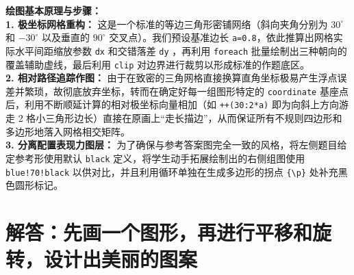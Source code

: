{\small\color{blue!70!black}
\textbf{绘图基本原理与步骤：}\\
\textbf{1. 极坐标网格重构：} 这是一个标准的等边三角形密铺网络（斜向夹角分别为 $30^\circ$ 和 $-30^\circ$ 以及垂直的 $90^\circ$ 交叉点）。我们预设基准边长 \texttt{a=0.8}，依此推算出网格实际水平间距缩放参数 \texttt{dx} 和交错落差 \texttt{dy} ，再利用 \texttt{foreach} 批量绘制出三种朝向的覆盖辅助虚线，最后利用 \texttt{clip} 对边界进行裁剪以形成标准的作题底区。\\
\textbf{2. 相对路径追踪作图：} 由于在致密的三角网格直接换算直角坐标极易产生浮点误差并繁琐，故彻底放弃坐标，转而在确定好每一组图形特定的 \texttt{coordinate} 基座点后，利用不断顺延计算的相对极坐标向量相加（如 \texttt{++(30:2*a)} 即为向斜上方向游走 2 格小三角形边长）直接在原画上“走长描边”，从而保证所有不规则四边形和多边形地落入网格相交矩阵。\\
\textbf{3. 分离配置表现力图层：} 为了确保与参考答案图完全一致的风格，将左侧题目给定参考形使用默认 \texttt{black} 定义，将学生动手拓展绘制出的右侧组图使用 \texttt{blue!70!black} 以供对比，并且利用循环单独在生成多边形的拐点 \texttt{\{\textbackslash{}p\}} }处补充黑色圆形标记。%
\newpage



\section{解答：先画一个图形，再进行平移和旋转，设计出美丽的图案}

\vspace{0.6cm}

